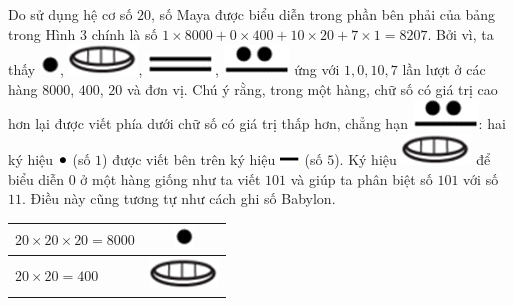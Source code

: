\begin{multicols}{2}
	Do sử dụng hệ cơ số $20$,  số Maya được biểu diễn trong phần bên phải của bảng trong Hình $3$ chính là số  $1\times 8000+ 0\times 400+ 10\times20+ 7\times1= 8207$. Bởi vì, ta  thấy  \includegraphics[scale=0.3]{33},  \includegraphics[scale=0.3]{34},  \includegraphics[scale=0.3]{35}, \includegraphics[scale=0.3]{36}  ứng với $1, 0, 10, 7$  lần lượt ở các hàng $8000$, $400$, $20$ và đơn vị. Chú ý rằng, trong một hàng, chữ số có giá trị cao hơn lại được viết phía dưới chữ số có giá trị thấp hơn, chẳng hạn  \includegraphics[scale=0.3]{36}:  hai ký hiệu \includegraphics[scale=0.7]{37} (số $1$) được viết bên trên ký hiệu \includegraphics[scale=0.7]{38} (số $5$). Ký hiệu \includegraphics[scale=0.3]{34} để biểu diễn $0$ ở một hàng giống như ta viết $101$ và giúp ta phân biệt số $101$ với số $11$. Điều này cũng tương tự như cách ghi số Babylon. 
	\begin{table}[H]
		\vspace*{-5pt}
		\centering
		\captionsetup{labelformat= empty, justification=centering}
		\setlength{\tabcolsep}{21pt}
		\renewcommand{\arraystretch}{1.25}
		\begin{tabular}{|l|c|}
			\hline
			$20\times 20\times 20 =8000$  & \includegraphics[scale=0.3]{33} \\
			\hline
			$20\times 20 =400$     & \includegraphics[scale=0.3]{34} \\

\end{tabular}
\end{table}
\end{multicols}

